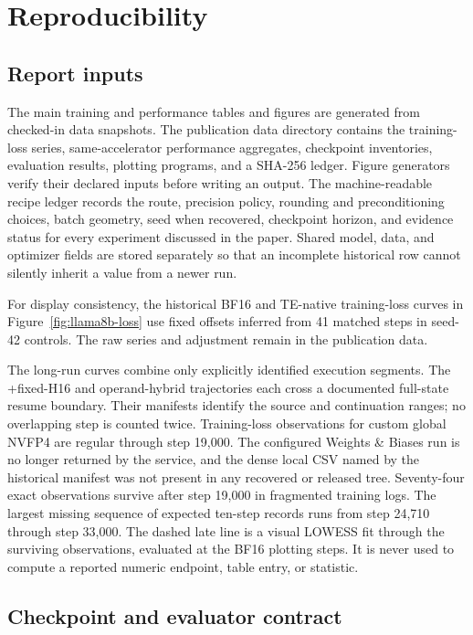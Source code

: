 \section{Reproducibility}
\label{app:reproducibility}

\subsection{Report inputs}

The main training and performance tables and figures are generated from
checked-in data snapshots. The publication data directory contains the
training-loss series, same-accelerator performance aggregates, checkpoint
inventories, evaluation results, plotting programs, and a SHA-256 ledger.
Figure generators verify their declared inputs before writing an output. The
machine-readable recipe ledger records the route, precision policy, rounding
and preconditioning choices, batch geometry, seed when recovered, checkpoint
horizon, and evidence status for every experiment discussed in the paper.
Shared model, data, and optimizer fields are stored separately so that an
incomplete historical row cannot silently inherit a value from a newer run.

For display consistency, the historical BF16 and TE-native training-loss
curves in Figure~\ref{fig:llama8b-loss} use fixed offsets inferred from 41
matched steps in seed-42 controls. The raw series and adjustment remain in the
publication data.

The long-run curves combine only explicitly identified execution segments.
The \localcta{}+fixed-H16 and operand-hybrid trajectories each cross a
documented full-state resume boundary. Their manifests identify the source and
continuation ranges; no overlapping step is counted twice. Training-loss
observations for custom global NVFP4 are regular through step 19,000. The
configured Weights \& Biases run is no longer returned by the service, and the
dense local CSV named by the historical manifest was not present in any
recovered or released tree. Seventy-four exact observations survive after
step 19,000 in fragmented training logs. The largest missing sequence of
expected ten-step records runs from step 24,710 through step 33,000. The
dashed late line is a visual LOWESS fit through the surviving observations,
evaluated at the BF16 plotting steps. It is never used to compute a reported numeric
endpoint, table entry, or statistic.

\subsection{Checkpoint and evaluator contract}

